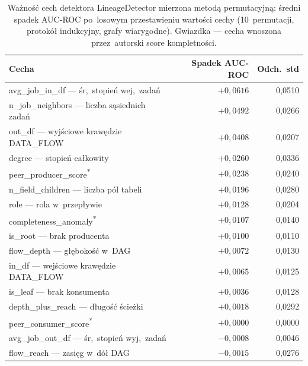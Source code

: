 \begin{table}[ht]
\centering
\caption{Ważność cech detektora LineageDetector mierzona metodą permutacyjną: średni spadek AUC-ROC po~losowym przestawieniu wartości cechy (10~permutacji, protokół indukcyjny, grafy wiarygodne). Gwiazdka — cecha wnoszona przez~autorski score kompletności.}
\label{tab:waznosc}
\small
\begin{tabular}{lrr}
\toprule
\textbf{Cecha} & \textbf{Spadek AUC-ROC} & \textbf{Odch.\ std} \\
\midrule
avg\_job\_in\_df — śr{,}\ stopień wej{,}\ zadań & $+0{,}0616$ & 0{,}0510 \\
n\_job\_neighbors — liczba sąsiednich zadań & $+0{,}0492$ & 0{,}0266 \\
out\_df — wyjściowe krawędzie DATA\_FLOW & $+0{,}0408$ & 0{,}0207 \\
degree — stopień całkowity & $+0{,}0260$ & 0{,}0336 \\
peer\_producer\_score\textsuperscript{*} & $+0{,}0238$ & 0{,}0240 \\
n\_field\_children — liczba pól tabeli & $+0{,}0196$ & 0{,}0280 \\
role — rola w~przepływie & $+0{,}0128$ & 0{,}0204 \\
completeness\_anomaly\textsuperscript{*} & $+0{,}0107$ & 0{,}0140 \\
is\_root — brak producenta & $+0{,}0100$ & 0{,}0110 \\
flow\_depth — głębokość w~DAG & $+0{,}0072$ & 0{,}0130 \\
in\_df — wejściowe krawędzie DATA\_FLOW & $+0{,}0065$ & 0{,}0125 \\
is\_leaf — brak konsumenta & $+0{,}0036$ & 0{,}0128 \\
depth\_plus\_reach — długość ścieżki & $+0{,}0018$ & 0{,}0292 \\
peer\_consumer\_score\textsuperscript{*} & $+0{,}0000$ & 0{,}0000 \\
avg\_job\_out\_df — śr{,}\ stopień wyj{,}\ zadań & $-0{,}0008$ & 0{,}0046 \\
flow\_reach — zasięg w~dół DAG & $-0{,}0015$ & 0{,}0276 \\
\bottomrule
\end{tabular}
\end{table}